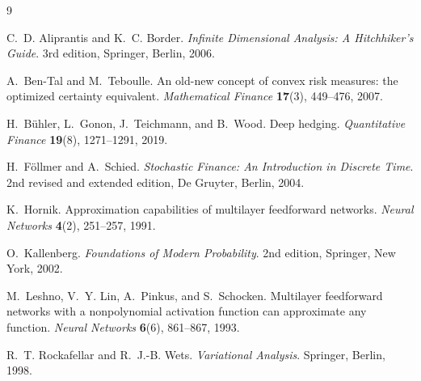\documentclass[11pt,a4paper]{report}
\numberwithin{equation}{chapter}
\theoremstyle{plain}
\theoremstyle{definition}
\begin{document}
\begin{thebibliography}{9}

    C.~D. Aliprantis and K.~C. Border.
    \emph{Infinite Dimensional Analysis: A Hitchhiker's Guide}.
    3rd edition, Springer, Berlin, 2006.

    A.~Ben-Tal and M.~Teboulle.
    An old-new concept of convex risk measures: the optimized certainty equivalent.
    \emph{Mathematical Finance} \textbf{17}(3), 449--476, 2007.

    H.~B\"uhler, L.~Gonon, J.~Teichmann, and B.~Wood.
    Deep hedging.
    \emph{Quantitative Finance} \textbf{19}(8), 1271--1291, 2019.

    H.~F\"ollmer and A.~Schied.
    \emph{Stochastic Finance: An Introduction in Discrete Time}.
    2nd revised and extended edition, De Gruyter, Berlin, 2004.

    K.~Hornik.
    Approximation capabilities of multilayer feedforward networks.
    \emph{Neural Networks} \textbf{4}(2), 251--257, 1991.

    O.~Kallenberg.
    \emph{Foundations of Modern Probability}.
    2nd edition, Springer, New York, 2002.

    M.~Leshno, V.~Y. Lin, A.~Pinkus, and S.~Schocken.
    Multilayer feedforward networks with a nonpolynomial activation function can approximate any function.
    \emph{Neural Networks} \textbf{6}(6), 861--867, 1993.

    R.~T. Rockafellar and R.~J.-B. Wets.
    \emph{Variational Analysis}.
    Springer, Berlin, 1998.

\end{thebibliography}
\end{document}
